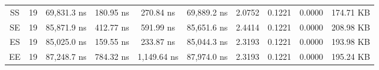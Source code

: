 \begin{sidewaystable}
\begin{tabular}{|c|c|c|c|c|c|c|c|c|c|}
        SS      &   19      &   69,831.3 ns           &   180.95 ns           &   270.84 ns             &   69,889.2 ns           &   2.0752      &   0.1221      &   0.0000      &   174.71 KB        \\
        SE      &   19      &   85,871.9 ns           &   412.77 ns           &   591.99 ns             &   85,651.6 ns           &   2.4414      &   0.1221      &   0.0000      &   208.98 KB        \\
        ES      &   19      &   85,025.0 ns           &   159.55 ns           &   233.87 ns             &   85,044.3 ns           &   2.3193      &   0.1221      &   0.0000      &   193.98 KB        \\
        EE      &   19      &   87,248.7 ns           &   784.32 ns           &   1,149.64 ns           &   87,974.0 ns           &   2.3193      &   0.1221      &   0.0000      &   195.24 KB        \\
        \hline    
    \end{tabular}
\end{sidewaystable}